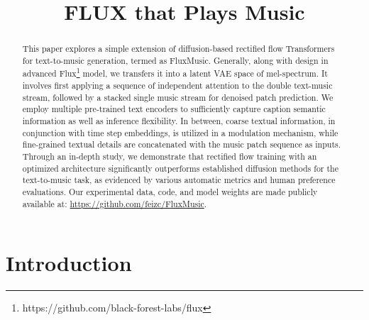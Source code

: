 \title{FLUX that Plays Music}




\begin{abstract}

This paper explores a simple extension of diffusion-based rectified flow Transformers for text-to-music generation, termed as FluxMusic.  
Generally, along with design in advanced Flux\footnote{https://github.com/black-forest-labs/flux} model, we transfers it into a latent VAE space of mel-spectrum. It involves first applying a sequence of independent attention to the double text-music stream, followed by a stacked single music stream for denoised patch prediction. We employ multiple pre-trained text encoders to sufficiently capture caption semantic information as well as inference flexibility. In between, coarse textual information, in conjunction with time step embeddings, is utilized in a modulation mechanism, while fine-grained textual details are concatenated with the music patch sequence as inputs. 
Through an in-depth study, we demonstrate that rectified flow training with an optimized architecture significantly outperforms established diffusion methods for the text-to-music task, as evidenced by various automatic metrics and human preference evaluations. 
Our experimental data, code, and model weights are made publicly available at: \url{https://github.com/feizc/FluxMusic}. 

\end{abstract}

\section{Introduction}

